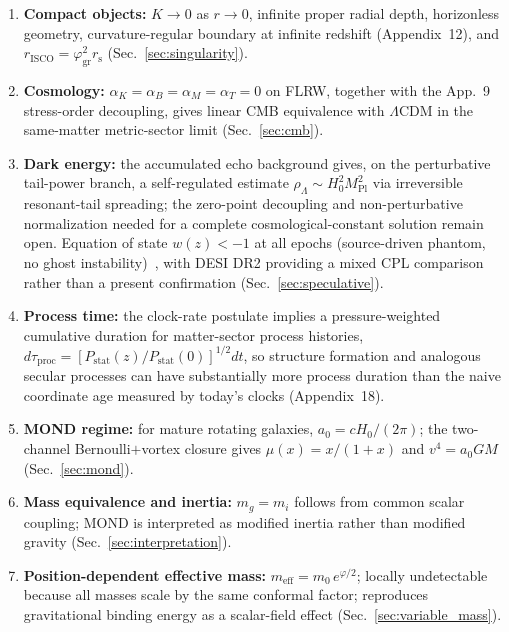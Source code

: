 \documentclass[aps,prd,onecolumn,superscriptaddress,nofootinbib,showpacs,12pt]{revtex4-2}
\newcommand{\Mpl}{M_{\mathrm{Pl}}}
\newcommand{\rs}{r_{\mathrm{s}}}
\newcommand{\azero}{a_{0}}
\newcommand{\phigr}{\varphi_{\mathrm{gr}}}
\begin{document}
\begin{enumerate}
\item \textbf{Compact objects:} $K\to0$ as $r\to0$,
  infinite proper radial depth, horizonless geometry,
  curvature-regular boundary at infinite redshift
  (Appendix~12), and $r_{\mathrm{ISCO}}=\phigr^2\rs$
  (Sec.~\ref{sec:singularity}).

\item \textbf{Cosmology:}
  $\alpha_K=\alpha_B=\alpha_M=\alpha_T=0$ on FLRW, together
  with the App.~9 stress-order decoupling, gives linear CMB
  equivalence with $\Lambda$CDM in the same-matter metric-sector
  limit (Sec.~\ref{sec:cmb}).

\item \textbf{Dark energy:}
  the accumulated echo background gives, on the perturbative
  tail-power branch, a self-regulated estimate
  $\rho_{\Lambda}\sim H_0^{2}\Mpl^{2}$ via irreversible
  resonant-tail spreading; the zero-point decoupling and
  non-perturbative normalization needed for a complete
  cosmological-constant solution remain open.  Equation of
  state $w(z)<-1$ at all
  epochs (source-driven phantom, no ghost instability)~\cite{Lotishvili2026Q},
  with DESI DR2 providing a mixed CPL comparison rather than
  a present confirmation
  (Sec.~\ref{sec:speculative}).

\item \textbf{Process time:}
  the clock-rate postulate implies a pressure-weighted
  cumulative duration for matter-sector process histories,
  $d\tau_{\mathrm{proc}}=
  [P_{\mathrm{stat}}(z)/P_{\mathrm{stat}}(0)]^{1/2}dt$,
  so structure formation and analogous secular processes
  can have substantially more process duration than the
  naive coordinate age measured by today's clocks
  (Appendix~18).

\item \textbf{MOND regime:}
  for mature rotating galaxies,
  $\azero=cH_0/(2\pi)$; the two-channel Bernoulli$+$vortex
  closure gives $\mu(x)=x/(1+x)$ and $v^4=\azero GM$
  (Sec.~\ref{sec:mond}).

\item \textbf{Mass equivalence and inertia:}
  $m_g=m_i$ follows from common scalar coupling; MOND is
  interpreted as modified inertia rather than modified gravity
  (Sec.~\ref{sec:interpretation}).

\item \textbf{Position-dependent effective mass:}
  $m_{\mathrm{eff}}=m_0\,e^{\varphi/2}$; locally
  undetectable because all masses scale by the same
  conformal factor; reproduces gravitational binding
  energy as a scalar-field effect
  (Sec.~\ref{sec:variable_mass}).


\end{enumerate}
\end{document}
